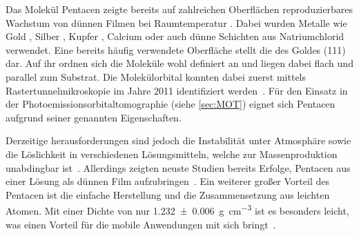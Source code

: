             Das Molekül Pentacen zeigte bereits auf zahlreichen Oberflächen reproduzierbares Wachstum von dünnen Filmen bei Raumtemperatur \cite{5A_9}.
            Dabei wurden Metalle wie Gold \cite{5A_6}, Silber \cite{5A_4}, Kupfer \cite{5A_1}, Calcium \cite{5A_5} oder auch dünne Schichten aus Natriumchlorid \cite{5A_10} verwendet.
            Eine bereits häufig verwendete Oberfläche stellt die des Goldes (111) dar.
            Auf ihr ordnen sich die Moleküle wohl definiert an und liegen dabei flach und parallel zum Substrat.
            Die Molekülorbital konnten dabei zuerst mittels Rastertunnelmikroskopie im Jahre 2011 identifiziert werden~\cite{5A_10}.
            Für den Einsatz in der Photoemissionsorbitaltomographie (siehe \autoref{sec:MOT}) eignet sich Pentacen aufgrund seiner genannten Eigenschaften. 

            Derzeitige herausforderungen sind jedoch die Instabilität unter Atmosphäre sowie die Löslichkeit in verschiedenen Lösungsmitteln, welche zur Massenproduktion unabdingbar ist~\cite{kus_chapter_2018}.
            Allerdings zeigten neuste Studien bereits Erfolge, Pentacen aus einer Lösung als dünnen Film aufzubringen~\cite{5A_7}.
            Ein weiterer großer Vorteil des Pentacen ist die einfache Herstellung \cite{kus_chapter_2018} und die Zusammensetzung aus leichten Atomen.
            Mit einer Dichte von nur \SI{1.232(6)}{\gram\per\cubic\centi\meter} ist es besonders leicht, was einen Vorteil für die mobile Anwendungen mit sich bringt~\cite{CAS}.
